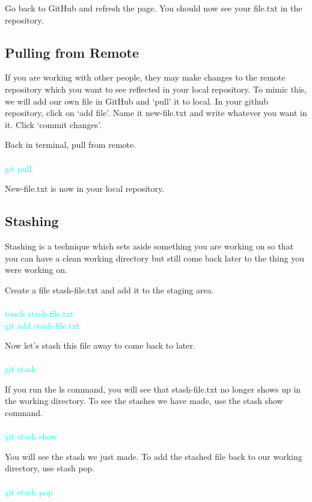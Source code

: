 \documentclass[10pt,twocolumn]{article}
\begin{document}
Go back to GitHub and refresh the page. You should now see your file.txt in the repository. 


\subsection{Pulling from Remote}

If you are working with other people, they may make changes to the remote repository which you want to see reflected in your local repository. To mimic this, we will add our own file in GitHub and ‘pull’ it to local. In your github repository, click on ‘add file’. Name it new-file.txt and write whatever you want in it. Click ‘commit changes’.

Back in terminal, pull from remote.\\\\
\textcolor{cyan}{
git pull\\
}

New-file.txt is now in your local repository.


\subsection{Stashing}

Stashing is a technique which sets aside something you are working on so that you can have a clean working directory but still come back later to the thing you were working on. 

Create a file stash-file.txt and add it to the staging area.\\\\
\textcolor{cyan}{
touch stash-file.txt\\
git add stash-file.txt\\
}

Now let’s stash this file away to come back to later. \\\\
\textcolor{cyan}{
git stash \\
}

If you run the ls command, you will see that stash-file.txt no longer shows up in the working directory. To see the stashes we have made, use the stash show command. \\\\
\textcolor{cyan}{
git stash show\\
}

You will see the stash we just made. To add the stashed file back to our working directory, use stash pop.\\\\
\textcolor{cyan}{
git stash pop\\
}
\end{document}
